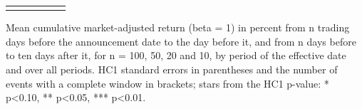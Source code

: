 \begin{threeparttable}
\begin{tabular}{@{}lccccc}
\addlinespace[0.25ex]
\bottomrule
\end{tabular}
\endgroup
\noindent\begin{minipage}{\linewidth}\smallskip\footnotesize
Mean cumulative market-adjusted return (beta = 1) in percent from n trading days before the announcement date to the day before it, and from n days before to ten days after it, for n = 100, 50, 20 and 10, by period of the effective date and over all periods. HC1 standard errors in parentheses and the number of events with a complete window in brackets; stars from the HC1 p-value: * p<0.10, ** p<0.05, *** p<0.01.\end{minipage}

\end{threeparttable}